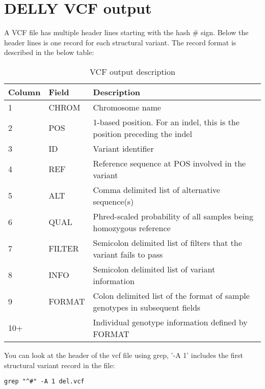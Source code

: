 \section{DELLY VCF output}

\begin{information}
A VCF file has multiple header lines starting with the hash \# sign. Below the header lines is one record for each structural variant. The record format is described in the below table:


\begin{table}[H]
  \centering
  \caption{VCF output description}
    \begin{tabular}{lll}
    \toprule
    Column & Field & Description \\
    \midrule
    1 & CHROM & Chromosome name \\
    2 & POS & 1-based position. For an indel, this is the position preceding the indel \\
    3 & ID & Variant identifier \\
    4 & REF & Reference sequence at POS involved in the variant \\
    5 & ALT & Comma delimited list of alternative sequence(s) \\
    6 & QUAL & Phred-scaled probability of all samples being homozygous reference \\
    7 & FILTER & Semicolon delimited list of filters that the variant fails to pass \\
    8 & INFO & Semicolon delimited list of variant information \\
    9 & FORMAT & Colon delimited list of the format of sample genotypes in subsequent fields \\
    10+ & & Individual genotype information defined by FORMAT \\
    \bottomrule
    \end{tabular}
  \label{tab:vcfoutput}
\end{table}


\end{information}
\begin{steps}
You can look at the header of the vcf file using grep, '-A 1' includes the first structural variant record in the file:

\begin{lstlisting}
grep "^#" -A 1 del.vcf
\end{lstlisting}
\end{steps}

